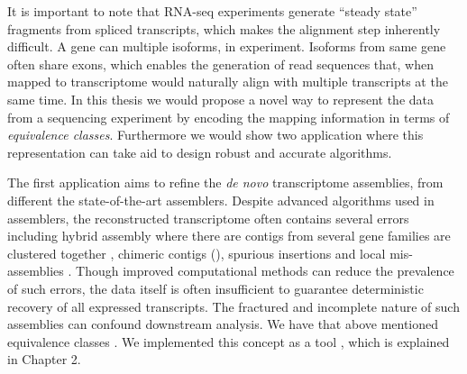 It is important to note that RNA-seq experiments generate ``steady state''  fragments from spliced transcripts, which makes the alignment step inherently difficult. A gene can  multiple isoforms,  in  experiment. Isoforms from  same gene often share exons, which enables the generation of read sequences that, when mapped to transcriptome would naturally align with multiple transcripts at the same time. In this thesis we would propose a novel way to represent the data from a sequencing experiment by encoding the mapping information in terms of {\it equivalence classes}. Furthermore we would show two application where this representation can take aid to design robust and accurate algorithms. 

The first application aims to refine the {\it de novo} transcriptome assemblies,  from different the state-of-the-art assemblers.   Despite  advanced algorithms used in assemblers, the reconstructed transcriptome often contains several errors including hybrid assembly where there are contigs from several gene families are clustered together , chimeric contigs (), spurious insertions and local mis-assemblies \citep{transrate}. Though improved computational methods can reduce the prevalence of such errors, the data itself is often insufficient to guarantee deterministic recovery of all expressed transcripts.  The fractured and incomplete nature of such \denovo assemblies can confound downstream analysis. We have  that  above mentioned equivalence classes . We implemented this concept as a tool \rapclust, which is explained in Chapter 2.

